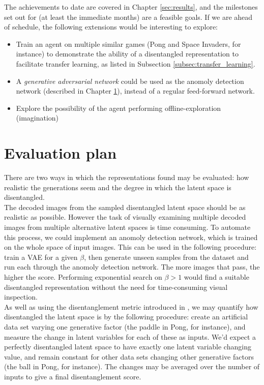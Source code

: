 \documentclass[12pt,twoside]{article}
\begin{document}
The achievements to date are covered in Chapter \ref{sec:results}, and the milestones set out for (at least the immediate months) are a feasible goals. If we are ahead of schedule, the following extensions would be interesting to explore:

\begin{itemize}
\item Train an agent on multiple similar games (Pong and Space Invaders, for instance) to demonstrate the ability of a disentangled representation to facilitate transfer learning, as listed in Subsection \ref{subsec:transfer_learning}.
\item A \textit{generative adversarial network} could be used as the anomoly detection network (described in Chapter \ref{sec:evaluation_plan}), instead of a regular feed-forward network.
\item Explore the possibility of the agent performing offline-exploration (imagination)
\end{itemize}



\newpage
\section{Evaluation plan}
\label{sec:evaluation_plan}
There are two ways in which the representations found may be evaluated: how realistic the generations seem and the degree in which the latent space is disentangled.\\

The decoded images from the sampled disentangled latent space should be as realistic as possible. However the task of visually examining multiple decoded images from multiple alternative latent spaces is time consuming. To automate this process, we could implement an anomoly detection network, which is trained on the whole space of input images. This can be used in the following procedure: train a VAE for a given $\beta$, then generate unseen samples from the dataset and run each through the anomoly detection network. The more images that pass, the higher the score. Performing exponential search on $\beta>1$ would find a suitable disentangled representation without the need for time-consuming visual inspection.\\

As well as using the disentanglement metric introduced in \cite{Higgins2016}, we may quantify how disentangled the latent space is by the following procedure: create an artificial data set varying one generative factor (the paddle in Pong, for instance), and measure the change in latent variables for each of these as inputs. We'd expect a perfectly disentangled latent space to have exactly one latent variable changing value, and remain constant for other data sets changing other generative factors (the ball in Pong, for instance). The changes may be averaged over the number of inputs to give a final disentanglement score.\\
\end{document}

